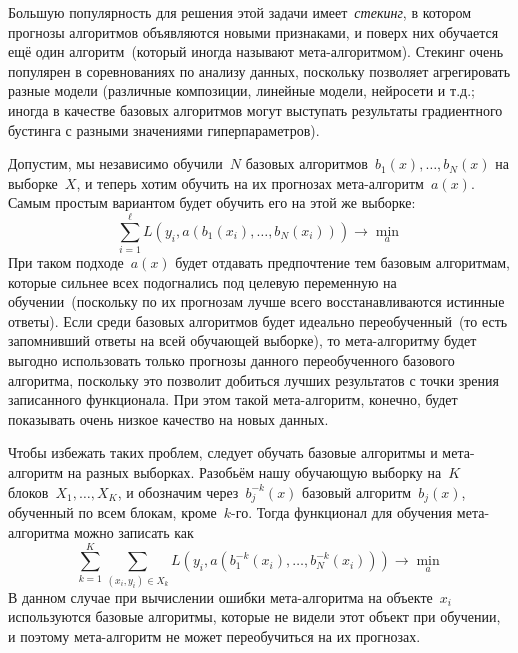 \documentclass[12pt,a4paper]{article}
\begin{document}
    Большую популярность для решения этой задачи имеет~\emph{стекинг}, в котором прогнозы алгоритмов объявляются
    новыми признаками, и поверх них обучается ещё один алгоритм~(который иногда называют мета-алгоритмом).
    Стекинг очень популярен в соревнованиях по анализу данных, поскольку позволяет агрегировать
    разные модели (различные композиции, линейные модели, нейросети и т.д.; иногда в качестве
    базовых алгоритмов могут выступать результаты градиентного бустинга с разными
    значениями гиперпараметров).
    
    Допустим, мы независимо обучили~$N$ базовых алгоритмов~$b_1(x), \dots, b_N(x)$ на выборке~$X$,
    и теперь хотим обучить на их прогнозах мета-алгоритм~$a(x)$.
    Самым простым вариантом будет обучить его на этой же выборке:
    \[
    \sum_{i = 1}^{\ell}
    L(y_i, a(b_1(x_i), \dots, b_N(x_i)))
    \to
    \min_{a}
    \]
    При таком подходе~$a(x)$ будет отдавать предпочтение тем базовым алгоритмам,
    которые сильнее всех подогнались под целевую переменную на обучении~(поскольку по их прогнозам
    лучше всего восстанавливаются истинные ответы).
    Если среди базовых алгоритмов будет идеально переобученный~(то есть запомнивший
    ответы на всей обучающей выборке), то мета-алгоритму будет выгодно
    использовать только прогнозы данного переобученного базового алгоритма,
    поскольку это позволит добиться лучших результатов с точки зрения записанного функционала.
    При этом такой мета-алгоритм, конечно, будет показывать очень низкое качество на новых данных.
    
    Чтобы избежать таких проблем, следует обучать базовые алгоритмы и мета-алгоритм
    на разных выборках.
    Разобьём нашу обучающую выборку на~$K$ блоков~$X_1, \dots, X_K$,
    и обозначим через~$b_j^{-k}(x)$ базовый алгоритм~$b_j(x)$, обученный по всем блокам,
    кроме~$k$-го.
    Тогда функционал для обучения мета-алгоритма можно записать как
    \[
    \sum_{k = 1}^{K}
    \sum_{(x_i, y_i) \in X_k}
    L\left(
    y_i,
    a(b_1^{-k}(x_i), \dots, b_N^{-k}(x_i))
    \right)
    \to
    \min_{a}
    \]
    В данном случае при вычислении ошибки мета-алгоритма на объекте~$x_i$
    используются базовые алгоритмы, которые не видели этот объект при обучении,
    и поэтому мета-алгоритм не может переобучиться на их прогнозах.
    
\end{document}
